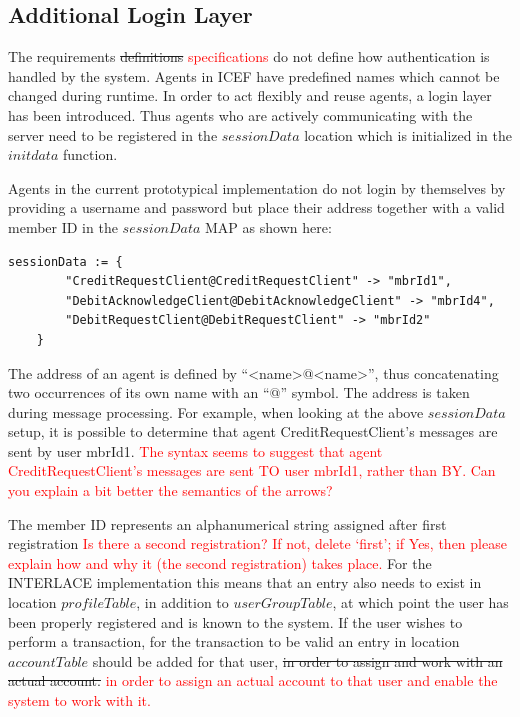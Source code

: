 \subsection{Additional Login Layer}
\label{subsec:impl-login-layer}

The requirements \st{definitions} \textcolor{red}{specifications} do not define how authentication is handled by the system. Agents in ICEF have predefined names which cannot be changed during runtime. In order to act flexibly and reuse agents, a login layer has been introduced. Thus agents who are actively communicating with the server need to be registered in the $sessionData$ location which is initialized in the $initdata$ function.

Agents in the current prototypical implementation do not login by themselves by providing a username and password but place their address together with a valid member ID in the $sessionData$ MAP as shown here:
\begin{lstlisting}[language=bsl]
	sessionData := {
		"CreditRequestClient@CreditRequestClient" -> "mbrId1",
		"DebitAcknowledgeClient@DebitAcknowledgeClient" -> "mbrId4",
		"DebitRequestClient@DebitRequestClient" -> "mbrId2"
	}
\end{lstlisting}
The address of an agent is defined by ``<name>@<name>'', thus concatenating two occurrences of its own name with an ``@'' symbol. The address is taken during message processing. For example, when looking at the above $sessionData$ setup, it is possible to determine that agent CreditRequestClient's messages are sent by user mbrId1. \textcolor{red}{The syntax seems to suggest that agent CreditRequestClient's messages are sent TO user mbrId1, rather than BY. Can you explain a bit better the semantics of the arrows?}

The member ID represents an alphanumerical string assigned after first registration \textcolor{red}{Is there a second registration? If not, delete `first'; if Yes, then please explain how and why it (the second registration) takes place.} For the INTERLACE implementation this means that an entry also needs to exist in location $profileTable$, in addition to $userGroupTable$, at which point the user has been properly registered and is known to the system. If the user wishes to perform a transaction, for the transaction to be valid an entry in location $accountTable$ should be added for that user, \st{in order to assign and work with an actual account.}  \textcolor{red}{in order to assign an actual account to that user and enable the system to work with it.}

